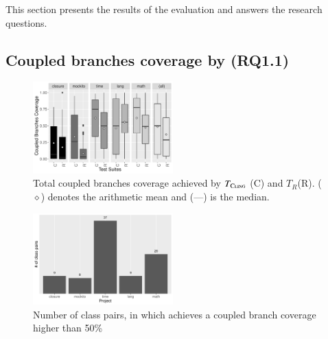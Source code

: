 
This section presents the results of the evaluation and answers the research questions.


\subsection{Coupled branches coverage by \cling (RQ1.1)}

    

\begin{figure}[t]
    \centering
    \includegraphics[width=0.48\textwidth]{papers/cling/figures/cbc-per-project.pdf}
    \caption{Total coupled branches coverage achieved by $T_{\textsc{Cling}}$ (C) and $T_R$(R). ($\diamond$) denotes the arithmetic mean and (---) is the median.}
    \label{fig:cbccoverage}
\end{figure}

\begin{figure}[t]
    \centering
    \includegraphics[width=0.48\textwidth]{papers/cling/figures/cbc-higher-than-50.pdf}
    \caption{Number of class pairs, in which \cling achieves a coupled branch coverage higher than 50\%}
    \label{fig:cbchigher50}
\end{figure}


